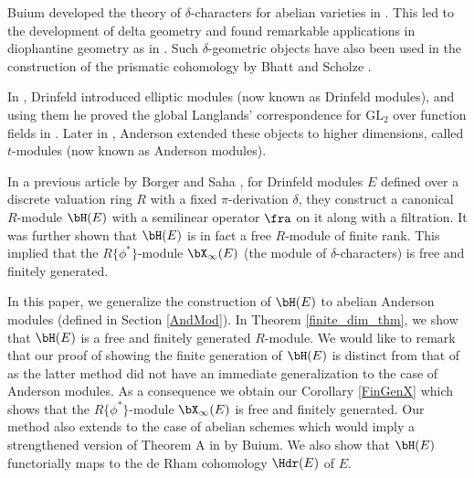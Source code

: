 \documentclass{amsart}
\def \d{\delta}
\numberwithin {equation}{section}
\def \d{\delta} \def \bZ{{\mathbb Z}} \def \bV{{\mathcal V}} \def \bF{{\bf F}}
\begin{document}
Buium developed the theory of $\d$-characters for 
abelian varieties in \cite{Buium 1995}. 
This led to the development of delta geometry 
\cite{Barc,Buium 2000,Buium-Miller,BuSa1, BuSa2,Hurl} and 
 found remarkable applications in 
diophantine geometry as in \cite{Buium 1996, BP}. Such $\d$-geometric
objects have also been used in the construction of the prismatic cohomology by
Bhatt and Scholze \cite{BhSc}.



In \cite{Drinfeld_74}, Drinfeld introduced elliptic modules 
(now known as Drinfeld modules), and using them he 
proved the global Langlands' correspondence for $\mathrm{GL}_2$ over function 
fields in \cite{Drinfeld_80}. 
Later in  \cite{Anderson 1986}, Anderson extended these objects to higher 
dimensions, called $t$-modules (now known as Anderson modules). 

 
In a previous article by Borger and Saha \cite{BS b}, 
for Drinfeld modules $E$ 
defined over a discrete valuation ring $R$ with a fixed $\pi$-derivation $\d$, 
they construct a canonical $R$-module $\bH(E)$ with a semilinear operator
$\fra$ on it along with a filtration. It was further shown 
that $\bH(E)$ is in fact a free $R$-module of 
finite rank. This implied that the $R\{\phi^*\}$-module $\bX_\infty(E)$ (the
module of $\d$-characters) is free and finitely generated.

In this paper, we generalize the construction of $\bH(E)$ to 
abelian Anderson modules (defined in Section
\ref{AndMod}). 
In Theorem \ref{finite_dim_thm}, we show that 
$\bH(E)$ is a free and
finitely generated $R$-module. We would like to remark that our proof of
showing the finite generation of $\bH(E)$ is distinct from that of \cite{BS b}
as the latter method did not have an immediate generalization to the case of 
Anderson modules.
As a consequence we obtain our Corollary \ref{FinGenX} which shows that the 
$R\{\phi^*\}$-module $\bX_\infty(E)$ is free and finitely generated. 
Our method also extends to the case of abelian schemes which would imply
a strengthened version of Theorem A in \cite{Buium 1995} by Buium. We also show that $\bH(E)$ functorially maps to the de Rham cohomology $\Hdr(E)$ of $E$.
\end{document}
